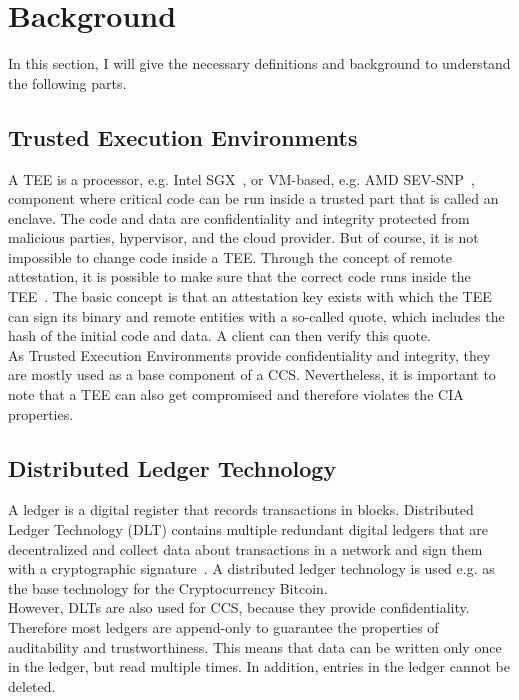 \section{Background}
In this section, I will give the necessary definitions and background to understand the following parts. 
\subsection{Trusted Execution Environments}
A TEE is a processor, e.g. Intel SGX~\cite{sgx}, or VM-based, e.g. AMD SEV-SNP~\cite{amd}, component where critical code can be run inside a trusted part that is called an enclave. The code and data are confidentiality and integrity protected from malicious parties, hypervisor, and the cloud provider.  But of course, it is not impossible to change code inside a TEE. Through the concept of remote attestation, it is possible to make sure that the correct code runs inside the TEE~\cite{remoteAttestation}.  The basic concept is that an attestation key exists with which the TEE can sign its binary and remote entities with a so-called quote, which includes the hash of the initial code and data. A client can then verify this quote. \\ %
As Trusted Execution Environments provide confidentiality and integrity, they are mostly used as a base component of a CCS. Nevertheless, it is important to note that a TEE can also get compromised and therefore violates the CIA properties.
\subsection{Distributed Ledger Technology}
A ledger is a digital register that records transactions in blocks. Distributed Ledger Technology (DLT) contains multiple redundant digital ledgers that are decentralized and collect data about transactions in a network and sign them with a cryptographic signature~\cite{ledger}. A distributed ledger technology is used e.g. as the base technology for the Cryptocurrency Bitcoin.\\
 However, DLTs are also used for CCS, because they provide confidentiality. Therefore most ledgers are append-only to guarantee the properties of auditability and trustworthiness. This means that data can be written only once in the ledger, but read multiple times. In addition, entries in the ledger cannot be deleted. 
